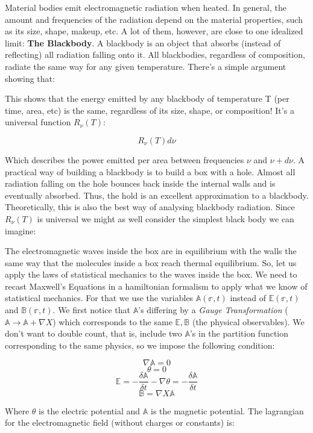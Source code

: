 \documentclass{article}
\newcommand{\pardif}[2]{\frac{\delta#1}{\delta#2}}
\newcommand{\brad}{R_{\nu}(T)}
\newcommand{\mbb}[1]{\mathbb{#1}}
\begin{document}
Material bodies emit electromagnetic radiation when heated.  In general, the amount and frequencies of the radiation depend on the material properties, such as its size, shape, makeup, etc.  A lot of them, however, are close to one idealized limit: \textbf{The Blackbody}.  A blackbody is an object that absorbs (instead of reflecting) all radiation falling onto it.  All blackbodies, regardless of composition, radiate the same way for any given temperature.  There's a simple argument showing that:


This shows that the energy emitted by any blackbody of temperature T (per time, area, etc) is the same, regardless of its size, shape, or composition!  It's a universal function $R_{\nu}(T)$:

$$R_{\nu}(T)d\nu$$

Which describes the power emitted per area between frequencies $\nu$ and $\nu+d\nu$.  A practical way of building a blackbody is to build a box with a hole.  Almost all radiation falling on the hole bounces back inside the internal walls and is eventually absorbed.  Thus, the hold is an excellent approximation to a blackbody.  Theoretically, this is also the best way of analysing blackbody radiation.  Since $\brad$ is universal we might as well consider the simplest black body we can imagine:


The electromagnetic waves inside the box are in equilibrium with the walls the same way that the molecules inside a box reach thermal equilibrium.  So, let us apply the laws of statistical mechanics to the waves inside the box.  We need to recast Maxwell's Equations in a hamiltonian formalism to apply what we know of statistical mechanics.  For that we use the variables $\mathbb{A}(\mathbb{r},t)$ instead of $\mathbb{E}(\mathbb{r},t)$ and $\mbb{B}(\mbb{r},t)$.  We first notice that $\mbb{A}$'s differing by a \textit{Gauge Transformation} ($\mbb{A}\rightarrow\mbb{A}+\nabla X$) which corresponds to the same $\mbb{E},\mbb{B}$ (the physical observables).  We don't want to double count, that is, include two $\mbb{A}$'s in the partition function corresponding to the same physics, so we impose the following condition:

$$\nabla\mbb{A}=0$$
$$\theta=0$$
$$\mbb{E}=-\pardif{\mbb{A}}{t}-\nabla\theta=-\pardif{\mbb{A}}{t}$$
$$\mbb{B}=\nabla X\mbb{A}$$

Where $\theta$ is the electric potential and $\mbb{A}$ is the magnetic potential.  The lagrangian for the electromagnetic field (without charges or constants) is:
\end{document}
